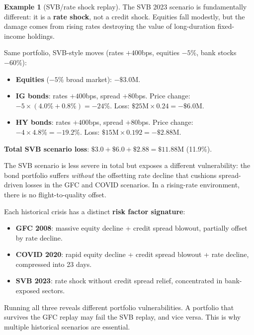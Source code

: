 \documentclass[11pt, a4paper]{article}
\theoremstyle{definition}
\newtheorem{example}{Example}[section]
\theoremstyle{plain}
\theoremstyle{remark}
\begin{document}
\begin{example}[SVB/rate shock replay]\label{ex:svb-replay}
The SVB 2023 scenario is fundamentally different: it is a \textbf{rate shock}, not a credit shock.
Equities fall modestly, but the damage comes from rising rates
destroying the value of long-duration fixed-income holdings.

Same portfolio, SVB-style moves (rates $+400$bps, equities $-5\%$, bank stocks $-60\%$):
\begin{itemize}
    \item \textbf{Equities} ($-5\%$ broad market): $-\$3.0\text{M}$.
    \item \textbf{IG bonds}: rates $+400$bps, spread $+80$bps.
          Price change: $-5 \times (4.0\% + 0.8\%) = -24\%$.
          Loss: $\$25\text{M} \times 0.24 = -\$6.0\text{M}$.
    \item \textbf{HY bonds}: rates $+400$bps, spread $+80$bps.
          Price change: $-4 \times 4.8\% = -19.2\%$.
          Loss: $\$15\text{M} \times 0.192 = -\$2.88\text{M}$.
\end{itemize}

\textbf{Total SVB scenario loss}: $\$3.0 + \$6.0 + \$2.88 = \$11.88\text{M}$ (11.9\%).

The SVB scenario is less severe in total but exposes a different vulnerability:
the bond portfolio suffers \emph{without} the offsetting rate decline that cushions
spread-driven losses in the GFC and COVID scenarios.
In a rising-rate environment, there is no flight-to-quality offset.
\end{example}

\begin{keyresult}
Each historical crisis has a distinct \textbf{risk factor signature}:
\begin{itemize}
    \item \textbf{GFC 2008}: massive equity decline + credit spread blowout, partially offset by rate decline.
    \item \textbf{COVID 2020}: rapid equity decline + credit spread blowout + rate decline, compressed into 23 days.
    \item \textbf{SVB 2023}: rate shock without credit spread relief, concentrated in bank-exposed sectors.
\end{itemize}
Running all three reveals different portfolio vulnerabilities.
A portfolio that survives the GFC replay may fail the SVB replay, and vice versa.
This is why multiple historical scenarios are essential.
\end{keyresult}
\end{document}

